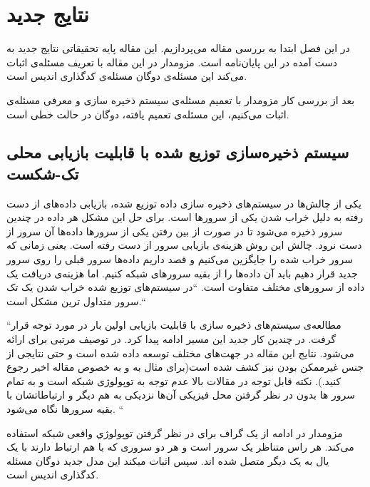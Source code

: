 \chapter{
نتایج جدید
}
\label{chapter:results}
در این فصل ابتدا به بررسی مقاله
\cite{arya}
 می‌پردازیم. این مقاله پایه تحقیقاتی نتایج جدید به دست آمده در این پایان‌نامه است. مزومدار در این مقاله با تعریف مسئله‌ی 
اثبات می‌کند این مسئله‌ی دوگان مسئله‌ی کدگذاری اندیس است.

بعد از بررسی کار مزومدار با تعمیم مسئله‌ی سیستم ذخیره سازی و معرفی مسئله‌ی
 اثبات می‌کنیم، این مسئله‌ی تعمیم یافته، دوگان 
 \picod
  در حالت خطی  است.
\newpage

\section{
 سیستم ذخیره‌سازی توزیع شده با قابلیت بازیابی محلی تک-شکست
}
یکی از چالش‌ها در سیستم‌های ذخیره سازی داده توزیع شده، بازیابی داده‌های از دست رفته به دلیل خراب شدن یکی از سرورها است. 
برای حل این مشکل هر داده در چندین سرور ذخیره می‌شود تا در صورت از بین رفتن یکی از سرورها داده‌ها آن سرور از دست نرود. چالش این روش هزینه‌ی بازیابی سرور از دست رفته است. یعنی زمانی که سرور خراب شده را جایگزین می‌کنیم و قصد داریم داده‌ها سرور قبلی را روی سرور جدید قرار دهیم باید آن داده‌ها را از بقیه سرورهای شبکه 
کنیم. اما هزینه‌ی دریافت یک داده از سرورهای مختلف متفاوت است.
``در سیستم‌های توزیع شده خراب شدن یک تک سرور متداول ترین مشکل است.``

``مطالعه‌ی سیستم‌های ذخیره سازی با قابلیت بازیابی اولین بار در
\cite{5550492}
مورد توجه قرار گرفت. در چندین کار جدید این مسیر ادامه پیدا کرد. در
\cite{6259860}
توصیف مرتبی برای
ارائه می‌شود. نتایج این مقاله در جهت‌های مختلف توسعه داده شده است و حتی نتایجی از جنس غیرممکن بودن نیز کشف شده است(برای مثال به
\cite{
	6570829, kamath2013codes,6818438,silberstein2013optimal, tamo2013optimal}
و به خصوص مقاله اخیر 
\cite{Tamo_2014}
رجوع کنید.). نکته قابل توجه در مقالات بالا عدم توجه به توپولوژی شبکه است و به تمام سرور ها بدون در نظر گرفتن محل فیزیکی آن‌ها نزدیکی به هم دیگر و ارتباطاتشان با بقیه سرورها نگاه می‌شود.
 ``
 
 مزومدار در ادامه از یک گراف برای در نظر گرفتن توپولوژي واقعی شبکه استفاده می‌کند. هر راس متناظر یک سرور است و هر دو سروری که با هم ارتباط دارند با یک یال به یک دیگر متصل شده اند. سپس اثبات میکند این مدل جدید دوگان مسئله کدگذاری اندیس است.
 
